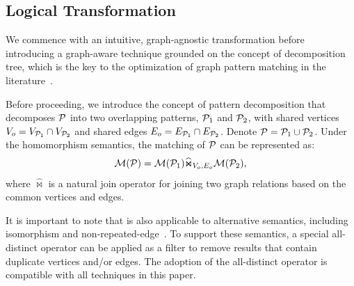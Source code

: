 \enlargethispage{1em}
\subsection{Logical Transformation}
\label{sec:handling-match-operator}
We commence with an intuitive, graph-agnostic transformation before
introducing a graph-aware technique grounded on the concept of decomposition tree, which
is the key to the optimization of graph pattern matching in the literature~\cite{huge,GLogS}.

Before proceeding, we introduce the concept of pattern decomposition that decomposes $\mathcal{P}$ into two overlapping patterns, $\mathcal{P}_1$ and $\mathcal{P}_2$, with shared vertices $V_{o} = V_{\mathcal{P}_1} \cap V_{\mathcal{P}_2}$ and shared edges $E_{o} = E_{\mathcal{P}_1} \cap E_{\mathcal{P}_2}$.
Denote $\mathcal{P} = \mathcal{P}_1 \cup \mathcal{P}_2$. Under the homomorphism semantics, the matching of $\mathcal{P}$ can be represented as:
\begin{equation}
    \label{eq:join-pattern}
    \mathcal{M}(\mathcal{P}) = \mathcal{M}(\mathcal{P}_1) \widehat{\Join}_{V_{o}, E_{o}} \mathcal{M}(\mathcal{P}_2),
\end{equation}
where $\widehat{\Join}$ is a natural join operator for joining two graph relations based on the common vertices and edges.

It is important to note that  is also applicable to alternative semantics, including isomorphism and non-repeated-edge~\cite{angles2017foundations}. To support these semantics, a special all-distinct operator can be applied as a filter to remove results that contain duplicate vertices and/or edges. The adoption of the all-distinct operator is compatible with all techniques in this paper.


\enlargethispage{1em}

